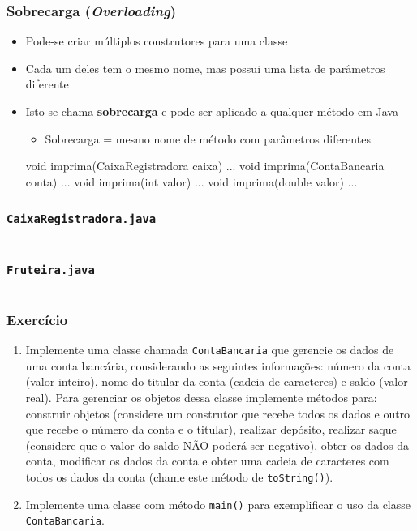 \documentclass[xcolor={dvipsnames,table},aspectratio=169]{beamer}
\begin{document}
\begin{frame}[fragile]\frametitle{Sobrecarga (\emph{Overloading})}
\begin{itemize}
	\item Pode-se criar múltiplos construtores para uma classe
	\item Cada um deles tem o mesmo nome, mas possui uma lista de parâmetros diferente
	\item Isto se chama \textbf{sobrecarga} e pode ser aplicado a qualquer método em Java
	\begin{itemize}
		\item Sobrecarga = mesmo nome de método com parâmetros diferentes
	\end{itemize}
\begin{javacode}
void imprima(CaixaRegistradora caixa) { ... }
void imprima(ContaBancaria conta)     { ... }
void imprima(int valor)               { ... }
void imprima(double valor)            { ... }
\end{javacode}
\end{itemize}
\end{frame}

\begin{frame}[fragile]\frametitle{\texttt{CaixaRegistradora.java}}
{\tiny\inputminted[bgcolor=cyan!10]{java}{src/caixa2/CaixaRegistradora.java}}
\end{frame}

\begin{frame}[fragile]\frametitle{\texttt{Fruteira.java}}
{\tiny\inputminted[bgcolor=cyan!10]{java}{src/caixa2/Fruteira.java}}
\end{frame}

\begin{frame}[fragile]\frametitle{Exercício}
\begin{enumerate}
	\item Implemente uma classe chamada \texttt{ContaBancaria} que gerencie os dados de uma conta bancária, considerando as seguintes informações: número da conta (valor inteiro), nome do titular da conta (cadeia de caracteres) e saldo (valor real). Para gerenciar os objetos dessa classe implemente métodos para: construir objetos (considere um construtor que recebe todos os dados e outro que recebe o número da conta e o titular), realizar depósito, realizar saque (considere que o valor do saldo NÃO poderá ser negativo), obter os dados da conta, modificar os dados da conta e obter uma cadeia de caracteres com todos os dados da conta (chame este método de \texttt{toString()}).
	\item Implemente uma classe com método \texttt{main()} para exemplificar o uso da classe \texttt{ContaBancaria}.
\end{enumerate}
\end{frame}
\end{document}
